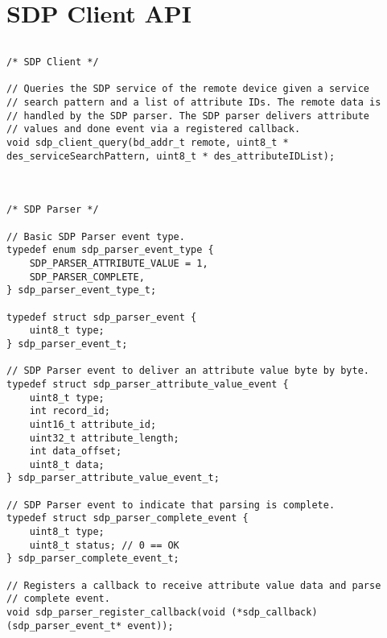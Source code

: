 \section{SDP Client API}
\label{appendix:api_sdp_client}
$ $
\begin{lstlisting}
/* SDP Client */

// Queries the SDP service of the remote device given a service 
// search pattern and a list of attribute IDs. The remote data is 
// handled by the SDP parser. The SDP parser delivers attribute 
// values and done event via a registered callback.
void sdp_client_query(bd_addr_t remote, uint8_t * des_serviceSearchPattern, uint8_t * des_attributeIDList);



/* SDP Parser */

// Basic SDP Parser event type.
typedef enum sdp_parser_event_type {
    SDP_PARSER_ATTRIBUTE_VALUE = 1,
    SDP_PARSER_COMPLETE,
} sdp_parser_event_type_t;

typedef struct sdp_parser_event {
    uint8_t type;
} sdp_parser_event_t;

// SDP Parser event to deliver an attribute value byte by byte.
typedef struct sdp_parser_attribute_value_event {
    uint8_t type;
    int record_id;
    uint16_t attribute_id;
    uint32_t attribute_length;
    int data_offset;
    uint8_t data;
} sdp_parser_attribute_value_event_t;

// SDP Parser event to indicate that parsing is complete.
typedef struct sdp_parser_complete_event {
    uint8_t type;
    uint8_t status; // 0 == OK
} sdp_parser_complete_event_t;

// Registers a callback to receive attribute value data and parse  
// complete event. 
void sdp_parser_register_callback(void (*sdp_callback)(sdp_parser_event_t* event));
\end{lstlisting}
\pagebreak